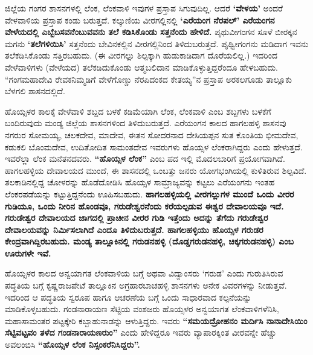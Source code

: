 ಜಿಲ್ಲೆಯ ಗಂಗರ ಶಾಸನಗಳಲ್ಲಿ ಲೆಂಕ, ಲೆಂಕವಾಳಿ ಇವುಗಳ ಪ್ರಸ್ತಾಪ ಸಿಗುವುದಿಲ್ಲ. ಆದರೆ \textbf{‘ವೇಳಯ’} ಅಂದರೆ ವೇಳವಾಳಿಯ ಪ್ರಸ್ತಾಪ ಕಂಡು ಬರುತ್ತದೆ. ಕಲ್ಕುಣಿಯ ವೀರಗಲ್ಲಿನಲ್ಲಿ \textbf{‘ಎರೆಯಂಗ ನೆರಪಲ್​’ ಎರೆಯಂಗನ ವೇಳೆಯದಲ್ಲಿ ಎಬ್ಬೆಬಸವನೆಂಬುವವನು ತಲೆ ಕಡಿಸಿಕೊಂಡು ಸತ್ತನೆಂದು ಹೇಳಿದೆ.} ಪೃಥುವೀಗಂಗನ ಸೂಳೆ ಬೀರಕ್ಕನ ಮಗನು \textbf{‘ತಲೆಗಳಿಯಿಸಿ’} ಸತ್ತನೆಂದು ಬೇವಿನಕಲ್ಲಿನ ವೀರಗಲ್ಲಿನಿಂದ ತಿಳಿದುಬರುತ್ತದೆ. ಪೃಥ್ವೀಗಂಗನು ಮಡಿದಾಗ ಇವನು ತಲೆಕಡಿಸಿಕೊಂಡು ಸತ್ತಿರಬಹುದು. (ಈ ವೀರಗಲ್ಲು ಶಿಲ್ಪಕ್ಕಾಗಿ ಹುಡುಕಾಡಿದಾಗ ದೊರೆಯಲಿಲ್ಲ.) ಇದರಿಂದ ವೇಳೆವಾಳಿಗಳು (ವೇಳೆಯದ) ತಲೆಕಡಿದುಕೊಂಡು ಆತ್ಮಬಲಿದಾನ ಮಾಡಿಕೊಳ್ಳುತ್ತಿದ್ದರೆಂದೂ ಹೇಳಬಹುದು. “ಗಂಗಮಹಾದೇವಿ ರೇವಕನಿಮ್ಮಡಿಗೆ ವೇಳೆಗೊಣ್ಡು ನೆರಪಿದಂಕದ ಕೇತಯ್ಯ”ನ ಪ್ರಸ್ತಾಪ ಅರಕಲಗೂಡು ತಾಲ್ಲೂಕು ಬೆಳಗಲಿ ಶಾಸನದಲ್ಲಿದೆ.

ಹೊಯ್ಸಳರ ಕಾಲಕ್ಕೆ ವೇಳೆವಾಳಿ ಶಬ್ದದ ಬಳಕೆ ಕಡಿಮೆಯಾಗಿ ಲೆಂಕ, ಲೆಂಕವಾಳಿ ಎಂಬ ಶಬ್ದಗಳು ಬಳಕೆಗೆ ಬಂದಿರುವುದು ಮಂಡ್ಯ ಜಿಲ್ಲೆಯ ಶಾಸನಗಳಿಂದ ತಿಳಿದುಬರುತ್ತದೆ. ಎರೆಯಂಗನ ಕಾಲದ ಹಾಗಲಹಳ್ಳಿ ಶಾಸನವು ನಗರುರ ಸೋಮಯ್ಯ, ಚಲಕದೇವ, ಮಾದೇವ, ಈತನ ಸೋದರನಾದ ದೇಸಿಯಪ್ಪನ ಸುತ ಕೊಂತಿಯ ಭೀಮದೇವ, ಕಡುಕಲಿ ಬೊಂಮದೇವ, ಉದಿತೋದಿತ ಸಾಮಂತದೇವ ಇವರುಗಳು ಹೊಯ್ಸಳ ಲೆಂಕರಾಗಿದ್ದರು ಎಂದು ಹೇಳುತ್ತದೆ. ಇವರೆಲ್ಲಾ ಲೆಂಕ ಮನೆತನದವರು. \textbf{“ಹೊಯ್ಸಳ ಲೆಂಕ”} ಎಂಬ ಪದ ಇಲ್ಲಿ ಮೊದಲಬಾರಿಗೆ ಪ್ರಯೋಗವಾಗಿದೆ. ಹಾಗಲಹಳ್ಳಿಯ ದೇವಾಲಯದ ಮುಂದೆ, ಈ ಶಾಸನದಲ್ಲಿ ಒಂಬತ್ತು ಜನರು ಯೋಗಭಂಗಿಯಲ್ಲಿ ಕುಳಿತಿರುವ ಶಿಲ್ಪವಿದೆ. ತಲಕಾಡಿನಲ್ಲಿದ್ದ ಚೋಳರನ್ನು ಹೊಡೆದೋಡಿಸಿ ಹೊಯ್ಸಳ ಸಾಮ್ರಾಜ್ಯವನ್ನು ಕಟ್ಟಲು ಎರೆಯಂಗನು ಇಂತಹ ಲೆಂಕರಪಡೆಯನ್ನು ಕಟ್ಟುತ್ತಿದ್ದನೆಂದು ಊಹಿಸಬಹುದು. \textbf{ಹಾಗಲಹಳ್ಳಿಯಲ್ಲಿ ವೀರಗಲ್ಲುಗಳ ಮುಂದೆ ಒಂದು ವೀರರ ಗುಡಿಯೂ, ಒಂದು ನೀರಿನ ಹೊಂಡವೂ, ಗರುಡೇಶ್ವರನೆಂದು ಕರೆಯಲ್ಪಡುವ ಈಶ್ವರ ದೇವಾಲಯವೂ ಇದೆ. ಗರುಡೇಶ್ವರ ದೇವಾಲಯದ ಜಾಗದಲ್ಲಿ ಪ್ರಾಚೀನ ವೀರರ ಗುಡಿ ಇತ್ತೆಂದು ಅದನ್ನು ತೆಗೆದು ಗರುಡೇಶ್ವರ ದೇವಾಲಯವನ್ನು ನಿರ್ಮಿಸಲಾಗಿದೆ ಎಂದೂ ತಿಳಿದುಬರುತ್ತದೆ. ಹಾಗಲಹಳ್ಳಿಯು ಹೊಯ್ಸಳ ಗರುಡರ ಕೇಂದ್ರವಾಗಿದ್ದಿರಬಹುದು. ಮಂಡ್ಯ ತಾಲ್ಲೂಕಿನಲ್ಲಿ ಗರುಡನಹಳ್ಳಿ (ದೊಡ್ಡಗರುಡನಹಳ್ಳಿ, ಚಿಕ್ಕಗರುಡನಹಳ್ಳಿ) ಎಂಬ ಊರುಗಳೇ ಇವೆ. }

ಹೊಯ್ಸಳರ ಕಾಲದ ಅನ್ವಯಾಗತ ಲೆಂಕವಾಳಿಯ ಬಗ್ಗೆ ಅಥವಾ ವಿದ್ವಾಂಸರು ‘ಗರುಡ’ ಎಂದು ಗುರುತಿಸಿರುವ ಪದ್ಧತಿಯ ಬಗ್ಗೆ ಕೃಷ್ಣರಾಜಪೇಟೆ ತಾಲ್ಲೂಕಿನ ಅಗ್ರಹಾರಬಾಚಹಳ್ಳಿ ಶಾಸನಗಳು ಅನೇಕ ವಿವರಗಳನ್ನು ನೀಡುತ್ತವೆ. ಇದರಿಂದ ಆ ಪದ್ಧತಿಯ ಸ್ವರೂಪ ಹಾಗೂ ಆಚರಣೆಯ ಬಗ್ಗೆ ಒಂದು ಸಾಧಾರವಾದ ಕಲ್ಪನೆಯನ್ನು ಮಾಡಿಕೊಳ್ಳಬಹುದು. ಗಂಡನಾರಾಯಣ ಸೆಟ್ಟಿಯ ವಂಶಜರು ಹೊಯ್ಸಳರ ಅನ್ವಯಾಗತ ಲೆಂಕವಾಳಿಗಳೆನಿಸಿ, ಮಹಾಸಾಮಂತರ ಪಟ್ಟಕ್ಕೇರಿ ಕಬ್ಬಾಹುನಾಡನ್ನು ಆಳುತ್ತಿದ್ದರು. ಇವರು \textbf{“ಸಮಯದ್ರೋಹನಂ ಮರ್ದಿಸಿ ನಾನಾದೇಸಿಯಿಂ ಸೆಟ್ಟಿವಟ್ಟವಂ ತಳೆದ ಗಂಡನಾರಾಯಣರುಂ”} ಎಂದು ಹೇಳಿದ್ದರೂ ಇವರು ವ್ಯಾಪಾರಕ್ಕಿಂತ ವೀರವನ್ನೇ ಹೆಚ್ಚು ಅವಲಂಬಿಸಿ \textbf{“ಹೊಯ್ಸಳ ಲೆಂಕ ನಿಸ್ಸಂಕರೆನಿಸಿದ್ದರು”. }

